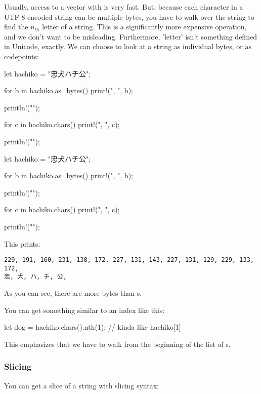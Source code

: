 Usually, access to a vector with \code{[]} is very fast. But, because each character in a UTF-8 encoded string can be multiple bytes, 
you have to walk over the string to find the $n_{th}$ letter of a string. This is a significantly more expensive operation, and we don't 
want to be misleading. Furthermore, 'letter' isn't something defined in Unicode, exactly. We can choose to look at a string as individual 
bytes, or as codepoints:

\begin{rustc}
let hachiko = "忠犬ハチ公";

for b in hachiko.as_bytes() {
    print!("{}, ", b);
}

println!("");

for c in hachiko.chars() {
    print!("{}, ", c);
}

println!("");
\end{rustc}

\begin{rustc}
let hachiko = "忠犬ハチ公";

for b in hachiko.as_bytes() {
    print!("{}, ", b);
}

println!("");

for c in hachiko.chars() {
    print!("{}, ", c);
}

println!("");
\end{rustc}

This prints:

\begin{verbatim}
229, 191, 160, 231, 138, 172, 227, 131, 143, 227, 131, 129, 229, 133, 172,
忠, 犬, ハ, チ, 公,
\end{verbatim}

As you can see, there are more bytes than \varchar s.

\blank

You can get something similar to an index like this:

\begin{rustc}
let dog = hachiko.chars().nth(1); // kinda like hachiko[1]
\end{rustc}

This emphasizes that we have to walk from the beginning of the list of \varchar s.

\subsubsection*{Slicing}

You can get a slice of a string with slicing syntax:

